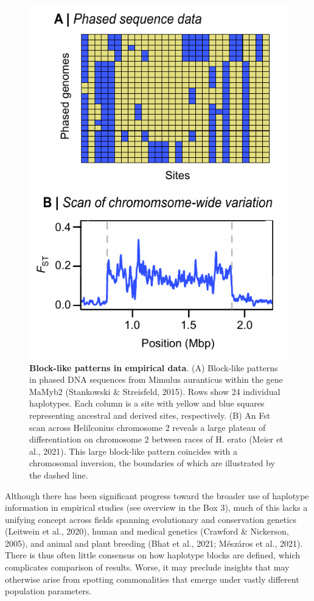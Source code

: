 \documentclass[twocolumn]{bmcart}%
\begin{document}
\begin{figure}
    \centering
    \includegraphics[width=0.89\linewidth]{Figure_1.pdf}
    \caption{\footnotesize{\textbf{Block-like patterns in empirical data}. (A) Block-like patterns in phased DNA sequences from Mimulus auranticus within the gene MaMyb2 (Stankowski \& Streisfeld, 2015). Rows show 24 individual haplotypes. Each column is a site with yellow and blue squares representing ancestral and derived sites, respectively. (B) An Fst scan across Helilconius chromosome 2 reveals a large plateau of differentiation on chromosome 2 between races of H. erato (Meier et al., 2021). This large block-like pattern coincides with a chromosomal inversion, the boundaries of which are illustrated by the dashed line.}}
    \label{fig:1}
\end{figure}

Although there has been significant progress toward the broader use of haplotype information in empirical studies (see overview in the Box 3), much of this lacks a unifying concept across fields spanning evolutionary and conservation genetics (Leitwein et al., 2020), human and medical genetics (Crawford \& Nickerson, 2005), and animal and plant breeding (Bhat et al., 2021; Mészáros et al., 2021). There is thus often little consensus on how haplotype blocks are defined, which complicates comparison of results. Worse, it may preclude insights that may otherwise arise from spotting commonalities that emerge under vastly different population parameters.
\end{document}
